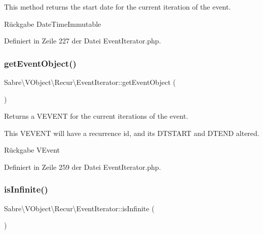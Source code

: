 This method returns the start date for the current iteration of the event.

\begin{DoxyReturn}{Rückgabe}
Date\+Time\+Immutable 
\end{DoxyReturn}


Definiert in Zeile 227 der Datei Event\+Iterator.\+php.

\mbox{\label{class_sabre_1_1_v_object_1_1_recur_1_1_event_iterator_a66dd3c533cde8d55dba168ea084d8962}} 
\subsubsection{\texorpdfstring{get\+Event\+Object()}{getEventObject()}}
{\footnotesize\ttfamily Sabre\textbackslash{}\+V\+Object\textbackslash{}\+Recur\textbackslash{}\+Event\+Iterator\+::get\+Event\+Object (\begin{DoxyParamCaption}{ }\end{DoxyParamCaption})}

Returns a V\+E\+V\+E\+NT for the current iterations of the event.

This V\+E\+V\+E\+NT will have a recurrence id, and it\textquotesingle{}s D\+T\+S\+T\+A\+RT and D\+T\+E\+ND altered.

\begin{DoxyReturn}{Rückgabe}
V\+Event 
\end{DoxyReturn}


Definiert in Zeile 259 der Datei Event\+Iterator.\+php.

\mbox{\label{class_sabre_1_1_v_object_1_1_recur_1_1_event_iterator_a85963da91fefa98d858c910e1cce95da}} 
\subsubsection{\texorpdfstring{is\+Infinite()}{isInfinite()}}
{\footnotesize\ttfamily Sabre\textbackslash{}\+V\+Object\textbackslash{}\+Recur\textbackslash{}\+Event\+Iterator\+::is\+Infinite (\begin{DoxyParamCaption}{ }\end{DoxyParamCaption})}

